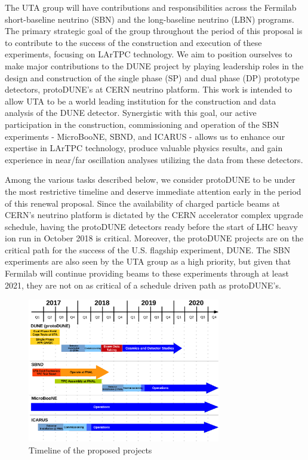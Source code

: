 The UTA group will have contributions and responsibilities across the Fermilab short-baseline neutrino (SBN) and the long-baseline neutrino (LBN) programs. The primary strategic goal of the group throughout the period of this proposal is to contribute to the success of the construction and execution of these experiments, focusing on LArTPC technology. We aim to position ourselves to make major contributions to the DUNE project by playing leadership roles in the design and construction of the single phase (SP) and dual phase (DP) prototype detectors, protoDUNE's at CERN neutrino platform. This work is intended to allow UTA to be a world leading institution for the construction and data analysis of the DUNE detector. Synergistic with this goal, our active participation in the construction, commissioning and operation of the SBN experiments - MicroBooNE, SBND, and ICARUS - allows us to enhance our expertise in LArTPC technology, produce valuable physics results, and gain experience in near/far oscillation analyses utilizing the data from these detectors.

Among the various tasks described below, we consider protoDUNE to be under the most restrictive timeline and deserve immediate attention early in the period of this renewal proposal. Since the availability of charged particle beams at CERN's neutrino platform is dictated by the CERN accelerator complex upgrade schedule, having the protoDUNE detectors ready before the start of LHC heavy ion run in October 2018 is critical. Moreover, the protoDUNE projects are on the critical path for the success of the U.S. flagship experiment, DUNE. The SBN experiments are also seen by the UTA group as a high priority, but given that Fermilab will continue providing beams to these experiments through at least 2021, they are not on as critical of a schedule driven path as protoDUNE's.

\begin{figure}[htb]
\centering
\includegraphics[width=0.75\textwidth]{images/Timeline.pdf}
\caption[]{Timeline of the proposed projects}
\label{fig:IFTimeline}
\end{figure}

